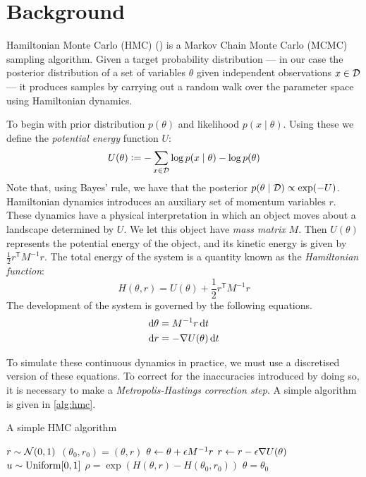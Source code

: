 
\section{Background}

Hamiltonian Monte Carlo (HMC) (\cite{duane-hmc,neal-hmc}) is a Markov Chain Monte Carlo (MCMC) sampling algorithm. Given a target probability distribution — in our case the posterior distribution of a set of variables $\theta$ given independent observations $x \in \mathcal{D}$ — it produces samples by carrying out a random walk over the parameter space using Hamiltonian dynamics.

To begin with prior distribution $p(\theta)$ and likelihood $p(x \mid \theta)$. Using these we define the \emph{potential energy} function $U$:
\begin{equation*}
    U(\theta) \vcentcolon= - \sum_{x \in \mathcal{D}}\log p(x \mid \theta) - \log p(\theta)
\end{equation*}
Note that, using Bayes' rule, we have that the posterior $p(\theta \mid \mathcal{D}) \propto \exp(-U)$. Hamiltonian dynamics introduces an auxiliary set of momentum variables $r$. These dynamics have a physical interpretation in which an object moves about a landscape determined by $U$. We let this object have \emph{mass matrix} $M$. Then $U(\theta)$ represents the potential energy of the object, and its kinetic energy is given by $\frac 1 2 r^{\mathsf T} M^{-1} r$. The total energy of the system is a quantity known as the \emph{Hamiltonian function}:
\begin{equation*}
    H(\theta, r) = U(\theta) + \frac 1 2 r^{\mathsf T} M^{-1} r
\end{equation*}
The development of the system is governed by the following equations.
\begin{align*}
    \dif\theta &= M^{-1}r \dif t \\
    \dif r &= - \nabla U(\theta) \dif t
\end{align*}

To simulate these continuous dynamics in practice, we must use a discretised version of these equations. To correct for the inaccuracies introduced by doing so, it is necessary to make a \emph{Metropolis-Hastings correction step}. A simple algorithm is given in \cref{alg:hmc}.

\begin{algorithm}
    \caption{A simple HMC algorithm}\label{alg:hmc}
    \begin{algorithmic}
            \State $r \sim \mathcal N(0,1)$ 
            \State $(\theta_0, r_0) = (\theta, r)$ 
                \State $\theta \gets \theta + \epsilon M^{-1}r$
                \State $r \gets r - \epsilon \nabla U(\theta)$
            \EndFor
            \State $u \sim \rm{Uniform}[0,1]$
            \State $\rho = \exp(H(\theta, r) - H(\theta_0, r_0))$ 
             
                \State $\theta = \theta_0$
            \EndIf
        \EndFor
    \end{algorithmic}
\end{algorithm}

